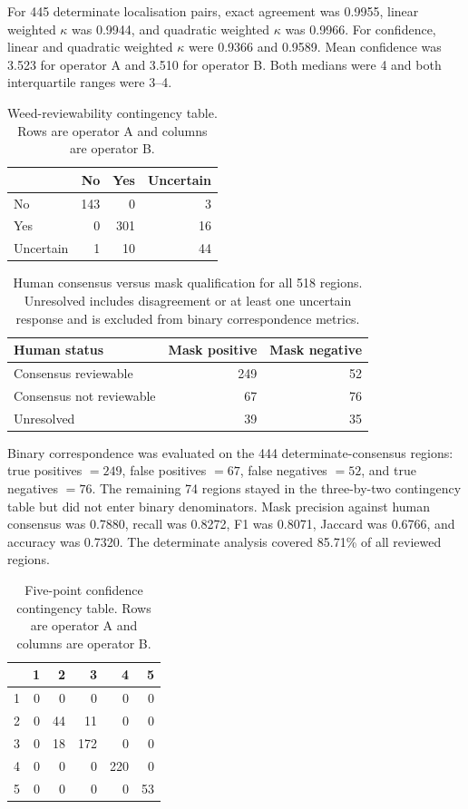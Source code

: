 \documentclass[preprint,12pt]{elsarticle}
\begin{document}
For 445 determinate localisation pairs, exact agreement was 0.9955, linear weighted $\kappa$ was 0.9944, and quadratic weighted $\kappa$ was 0.9966. For confidence, linear and quadratic weighted $\kappa$ were 0.9366 and 0.9589. Mean confidence was 3.523 for operator A and 3.510 for operator B. Both medians were 4 and both interquartile ranges were 3--4.

\begin{table}[htbp]
\centering
\caption{Weed-reviewability contingency table. Rows are operator A and columns are operator B.}
\label{tab:s8weed}
\small
\begin{tabular}{lrrr}
\toprule
 & No & Yes & Uncertain \\
\midrule
No & 143 & 0 & 3 \\
Yes & 0 & 301 & 16 \\
Uncertain & 1 & 10 & 44 \\
\bottomrule
\end{tabular}
\end{table}

\begin{table}[htbp]
\centering
\caption{Human consensus versus mask qualification for all 518 regions. Unresolved includes disagreement or at least one uncertain response and is excluded from binary correspondence metrics.}
\label{tab:s8humanmask}
\small
\begin{tabular}{lrr}
\toprule
Human status & Mask positive & Mask negative \\
\midrule
Consensus reviewable & 249 & 52 \\
Consensus not reviewable & 67 & 76 \\
Unresolved & 39 & 35 \\
\bottomrule
\end{tabular}
\end{table}

Binary correspondence was evaluated on the 444 determinate-consensus regions: true positives $=249$, false positives $=67$, false negatives $=52$, and true negatives $=76$. The remaining 74 regions stayed in the three-by-two contingency table but did not enter binary denominators. Mask precision against human consensus was 0.7880, recall was 0.8272, F1 was 0.8071, Jaccard was 0.6766, and accuracy was 0.7320. The determinate analysis covered 85.71\% of all reviewed regions.

\begin{table}[htbp]
\centering
\caption{Five-point confidence contingency table. Rows are operator A and columns are operator B.}
\label{tab:s8confidence}
\small
\begin{tabular}{lrrrrr}
\toprule
 & 1 & 2 & 3 & 4 & 5 \\
\midrule
1 & 0 & 0 & 0 & 0 & 0 \\
2 & 0 & 44 & 11 & 0 & 0 \\
3 & 0 & 18 & 172 & 0 & 0 \\
4 & 0 & 0 & 0 & 220 & 0 \\
5 & 0 & 0 & 0 & 0 & 53 \\
\bottomrule
\end{tabular}
\end{table}
\end{document}
